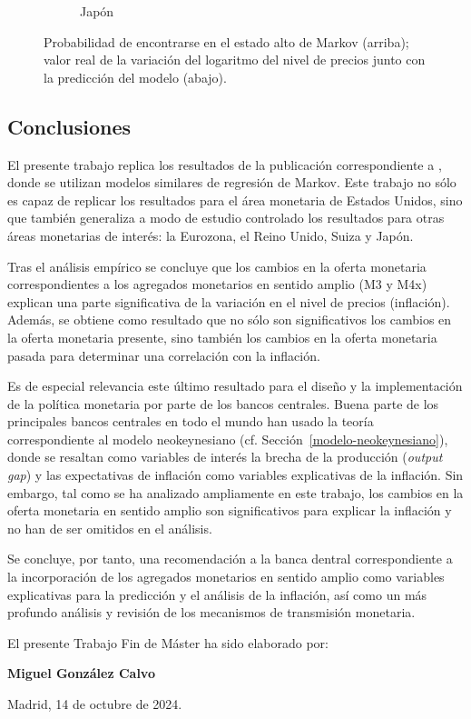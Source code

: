 \documentclass[titlepage, 12pt]{article}
\begin{document}
\begin{figure}
\begin{subfigure}[b]{0.49\textwidth}
        \caption{Japón}
    \end{subfigure}
    \caption{Probabilidad de encontrarse en el estado alto de Markov (arriba); valor real de la variación del logaritmo del nivel de precios junto con la predicción del modelo (abajo).}
    \label{fig:markov-cpi}
\end{figure}

\newpage
\subsection{Conclusiones}
El presente trabajo replica los resultados de la publicación correspondiente a \cite{castaneda2023}, donde se utilizan modelos similares de regresión de Markov. Este trabajo no sólo es capaz de replicar los resultados para el área monetaria de Estados Unidos, sino que también generaliza a modo de estudio controlado los resultados para otras áreas monetarias de interés: la Eurozona, el Reino Unido, Suiza y Japón.

Tras el análisis empírico se concluye que los cambios en la oferta monetaria correspondientes a los agregados monetarios en sentido amplio (M3 y M4x) explican una parte significativa de la variación en el nivel de precios (inflación). Además, se obtiene como resultado que no sólo son significativos los cambios en la oferta monetaria presente, sino también los cambios en la oferta monetaria pasada para determinar una correlación con la inflación.

Es de especial relevancia este último resultado para el diseño y la implementación de la política monetaria por parte de los bancos centrales. Buena parte de los principales bancos centrales en todo el mundo han usado la teoría correspondiente al modelo neokeynesiano (cf. Sección~\ref{modelo-neokeynesiano}), donde se resaltan como variables de interés la brecha de la producción (\textit{output gap}) y las expectativas de inflación como variables explicativas de la inflación. Sin embargo, tal como se ha analizado ampliamente en este trabajo, los cambios en la oferta monetaria en sentido amplio son significativos para explicar la inflación y no han de ser omitidos en el análisis.

Se concluye, por tanto, una recomendación a la banca dentral correspondiente a la incorporación de los agregados monetarios en sentido amplio como variables explicativas para la predicción y el análisis de la inflación, así como un más profundo análisis y revisión de los mecanismos de transmisión monetaria.

\nocite{*}
\newpage
\printbibliography

\newpage
\begin{appendices}
    
\end{appendices}

\newpage

El presente Trabajo Fin de Máster ha sido elaborado por:

\vspace{3cm}

\textbf{Miguel González Calvo}

Madrid, 14 de octubre de 2024.
\end{document}
